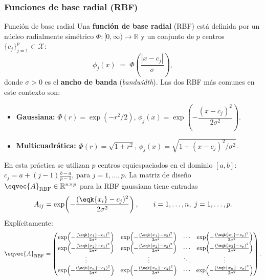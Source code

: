 \subsubsection{Funciones de base radial (RBF)}
\label{sec:rbf}

\begin{definicion}{Función de base radial}
\label{def:rbf}
Una \textbf{función de base radial} (RBF) está definida por un núcleo
radialmente simétrico $\Phi : [0,\infty) \to \mathbb{R}$ y un conjunto
de $p$ centros $\{c_j\}_{j=1}^p \subset \mathcal{X}$:
\[
  \phi_j(x) \;=\; \Phi\!\left(\frac{|x - c_j|}{\sigma}\right),
\]
donde $\sigma > 0$ es el \textbf{ancho de banda} (\textit{bandwidth}).
Las dos RBF más comunes en este contexto son:

\begin{itemize}[nosep, leftmargin=1.5em]
  \item \textbf{Gaussiana:}
    $\Phi(r) = \exp(-r^2/2)$,\quad
    $\phi_j(x) = \exp\!\left(-\dfrac{(x-c_j)^2}{2\sigma^2}\right)$.
  \item \textbf{Multicuadrática:}
    $\Phi(r) = \sqrt{1 + r^2}$,\quad
    $\phi_j(x) = \sqrt{1 + (x-c_j)^2/\sigma^2}$.
\end{itemize}
\end{definicion}

En esta práctica se utilizan $p$ centros equiespaciados en el dominio $[a,b]$:
$c_j = a + (j-1)\frac{b-a}{p-1}$, para $j=1,\dots,p$. La matriz de diseño
$\eqvec{A}_{\mathrm{RBF}} \in \mathbb{R}^{n \times p}$ para la RBF gaussiana tiene entradas
\[
  A_{ij} = \exp\!\left(-\frac{(\eqk{x_i} - c_j)^2}{2\sigma^2}\right),
  \qquad i=1,\dots,n,\; j=1,\dots,p.
\]
Explícitamente:
\[
\eqvec{A}_{\mathrm{RBF}} =
\begin{pmatrix}
\exp\!\left(-\frac{(\eqk{x_1}-c_1)^2}{2\sigma^2}\right) & \exp\!\left(-\frac{(\eqk{x_1}-c_2)^2}{2\sigma^2}\right) & \cdots & \exp\!\left(-\frac{(\eqk{x_1}-c_p)^2}{2\sigma^2}\right) \\
\exp\!\left(-\frac{(\eqk{x_2}-c_1)^2}{2\sigma^2}\right) & \exp\!\left(-\frac{(\eqk{x_2}-c_2)^2}{2\sigma^2}\right) & \cdots & \exp\!\left(-\frac{(\eqk{x_2}-c_p)^2}{2\sigma^2}\right) \\
\vdots & \vdots & \ddots & \vdots \\
\exp\!\left(-\frac{(\eqk{x_n}-c_1)^2}{2\sigma^2}\right) & \exp\!\left(-\frac{(\eqk{x_n}-c_2)^2}{2\sigma^2}\right) & \cdots & \exp\!\left(-\frac{(\eqk{x_n}-c_p)^2}{2\sigma^2}\right)
\end{pmatrix}.
\]

